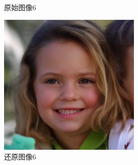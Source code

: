 \begin{figure}[H]
\begin{minipage}[b]{0.3\linewidth}
    \caption{原始图像6}
    \label{original image }
  \end{minipage}
\hspace{0.1cm}
  \begin{minipage}[b]{0.3\linewidth}
    \includegraphics[width=\linewidth]{Picture/recon/00006.png}
    \caption{还原图像6}
    \label{inpainted image}
  \end{minipage}
\end{figure}


